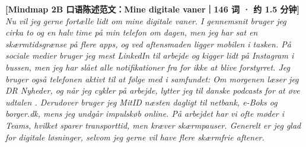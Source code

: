 \vspace{0.3em}
\begin{transbox}
\small
\textbf{\color{NCDNavy}[Mindmap 2B 口语陈述范文：Mine digitale vaner｜146 词 · 约 1.5 分钟]}\\
\textit{Nu vil jeg gerne fortælle lidt om mine digitale vaner. I gennemsnit bruger jeg cirka to og en halv time på min telefon om dagen, men jeg har sat en skærmtidsgrænse  på flere apps, og ved aftensmaden ligger mobilen i tasken. På sociale medier  bruger jeg mest LinkedIn til arbejde og kigger lidt på Instagram i bussen, men jeg har slået alle notifikationer  fra for ikke at blive forstyrret. Jeg bruger også telefonen aktivt til at følge med i samfundet: Om morgenen læser jeg DR Nyheder, og når jeg cykler på arbejde, lytter jeg til danske podcasts for at øve udtalen . Derudover bruger jeg MitID næsten dagligt til netbank, e-Boks og borger.dk, mens jeg undgår impulskøb  online. På arbejdet har vi ofte møder i Teams, hvilket sparer transporttid, men kræver skærmpauser. Generelt er jeg glad for digitale løsninger, selvom jeg gerne vil have flere skærmfrie aftener.}
\end{transbox}

